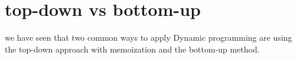 \section{top-down vs bottom-up}

we have seen that two common ways to apply Dynamic programming are using the top-down approach with memoization
and the bottom-up method. 